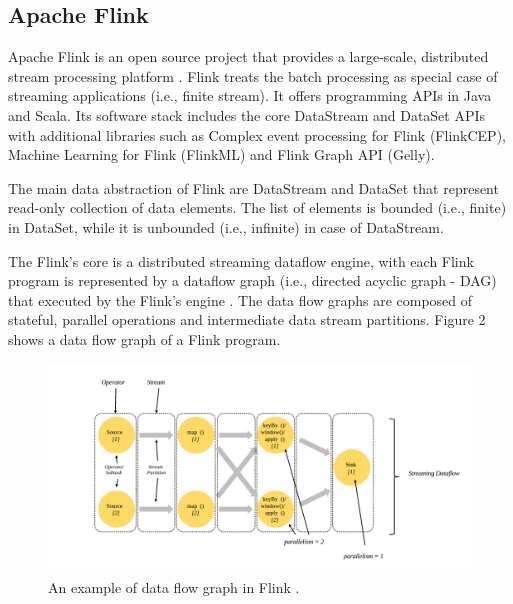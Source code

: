 \documentclass[]{article}
\begin{document}
\subsection{Apache Flink}

\par Apache Flink is an open source project that provides a large-scale, distributed stream processing platform \cite{flink}. Flink treats the batch processing as special case of streaming applications (i.e., finite stream).
It offers programming APIs in Java and Scala. Its software stack includes the core DataStream and DataSet APIs with additional libraries such as Complex event processing for Flink (FlinkCEP), Machine Learning for Flink (FlinkML)  and Flink Graph API (Gelly).

\par The main data abstraction of Flink are DataStream and DataSet that represent read-only collection of data elements. The list of elements is bounded (i.e., finite) in DataSet, while it is unbounded (i.e., infinite) in case of DataStream.

\par The Flink's core is a distributed streaming dataflow engine,  with each Flink program is represented by a dataflow graph (i.e., directed acyclic graph - DAG) that executed by the Flink's engine \cite{flink_paper}. The data flow graphs are composed of stateful, parallel operations and intermediate data stream partitions. Figure 2 shows a data flow graph of a Flink program.


\begin{figure}[h]
 
  \centering
    \includegraphics[width=\textwidth, height=.5\textheight]{flink_engine.png}
     \caption{ An example of data flow graph in Flink \cite{flink}.}
\end{figure} 
\newpage
\end{document}
